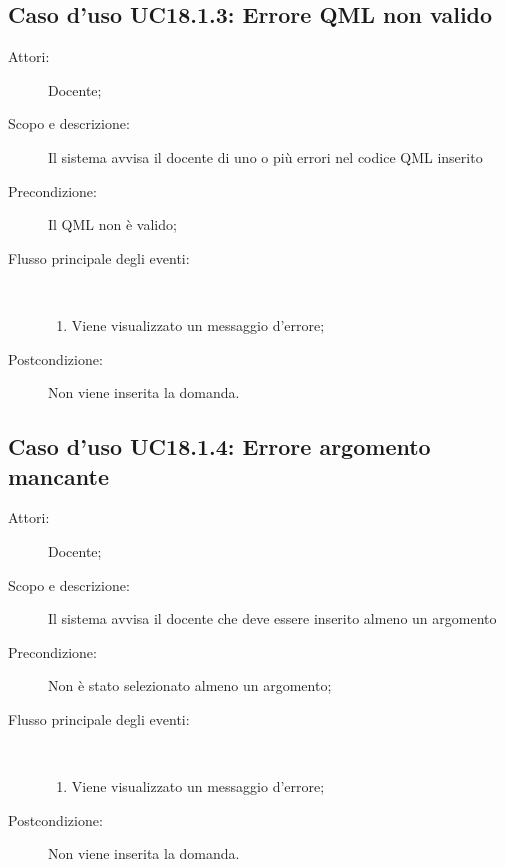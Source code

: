 \subsection{Caso d'uso UC18.1.3: Errore QML non valido}\begin{description}
\item[Attori:] Docente;
\item[Scopo e descrizione:] Il sistema avvisa il docente di uno o più errori nel codice QML inserito
      \item[Precondizione:] Il QML non è valido;

        \item[Flusso principale degli eventi:] \ 
 \begin{enumerate}
          \item Viene visualizzato un messaggio d'errore;

      \end{enumerate}
    \item[Postcondizione:] Non viene inserita la domanda.
  \end{description}
\hypertarget{UC18.1.4}{}
\subsection{Caso d'uso UC18.1.4: Errore argomento mancante}\begin{description}
\item[Attori:] Docente;
\item[Scopo e descrizione:] Il sistema avvisa il docente che deve essere inserito almeno un argomento
      \item[Precondizione:] Non è stato selezionato almeno un argomento;

        \item[Flusso principale degli eventi:] \ 
 \begin{enumerate}
          \item Viene visualizzato un messaggio d'errore;

      \end{enumerate}
    \item[Postcondizione:] Non viene inserita la domanda.
  \end{description}
\hypertarget{UC18.1.5}{}
